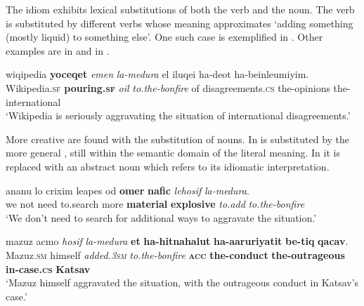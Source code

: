 \documentclass[output=paper]{langsci/langscibook}
\begin{document}
The idiom  exhibits lexical substitutions of both the verb and the noun. The verb  is substituted by different verbs whose meaning approximates `adding something (mostly liquid) to something else'. One such case is exemplified in . Other examples are  in  and  in .

    \ea\label{she:medura-sub-verb}
        \gll wiqipedia \textbf{yoceqet} \textit{{\shin}emen} \textit{la-medura} {\shin}el {\het}iluqei ha-de{\ayin}ot ha-beinle{\alef}umiyim.\\
            Wikipedia.\textsc{sf} \textbf{pouring.\textsc{sf}} \textit{oil} \textit{to.the-bonfire} of disagreements.\textsc{cs} the-opinions the-international\\
        \glt `Wikipedia is seriously aggravating the situation of international disagreements.'
    \z

More creative  are found with the substitution of nouns. In   is substituted by the more general , still within the semantic domain of the literal meaning. In  it is replaced with an abstract noun which refers to its idiomatic interpretation.

     \ea\label{she:medura-sub-do-lit}
        \gll {\alef}ana{\het}nu lo crixim le{\het}apes {\ayin}od \textbf{{\hetB}omer} \textbf{nafic} \textit{lehosif} \textit{la-medura}.\\
            we not need to.search more \textbf{material} \textbf{explosive} \textit{to.add} \textit{to.the-bonfire}\\
        \glt `We don't need to search for additional ways to aggravate the situation.'
    \z

	\ea\label{she:medura-sub-do-id}
    	\gll mazuz {\ayin}acmo \textit{hosif} \textit{la-medura} \textbf{{\alefB}et} \textbf{ha-hitnahalut} \textbf{ha-{\shinB}a{\ayinB}aruriyatit} \textbf{be-tiq} \textbf{qacav}.\\
    	   Mazuz.\textsc{sm} himself \textit{added.\textsc{3sm}} \textit{to.the-bonfire} \textbf{\textsc{acc}} \textbf{the-conduct} \textbf{the-outrageous} \textbf{in-case.\textsc{cs}} \textbf{Katsav}\\
    	\glt `Mazuz himself aggravated the situation, with the outrageous conduct in Katsav's case.'
	\z
\end{document}
